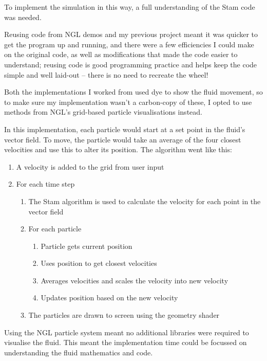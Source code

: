 \documentclass[notitlepage,12pt]{article}
\begin{document}
To implement the simulation in this way, a full understanding of the Stam code was needed.

Reusing code from NGL demos and my previous project meant it was quicker to get the program up and running, and there were a few efficiencies I could make on the original code, as well as modifications that made the code easier to understand; reusing code is good programming practice and helps keep the code simple and well laid-out -- there is no need to recreate the wheel!

Both the implementations I worked from used dye to show the fluid movement, so to make sure my implementation wasn't a carbon-copy of these, I opted to use methods from NGL's grid-based particle visualisations instead. 

In this implementation, each particle would start at a set point in the fluid's vector field. To move, the particle would take an average of the four closest velocities and use this to alter its position. The algorithm went like this:

\begin{enumerate}
    \item A velocity is added to the grid from user input
    \item For each time step
    \begin{enumerate}
        \item The Stam algorithm is used to calculate the velocity for each point in the vector field
        \item For each particle
        \begin{enumerate}
            \item Particle gets current position
            \item Uses position to get closest velocities
            \item Averages velocities and scales the velocity into new velocity
            \item Updates position based on the new velocity
        \end{enumerate}
        \item The particles are drawn to screen using the geometry shader
    \end{enumerate}
\end{enumerate}


Using the NGL particle system meant no additional libraries were required to visualise the fluid. This meant the implementation time could be focussed on understanding the fluid mathematics and code.
\end{document}
